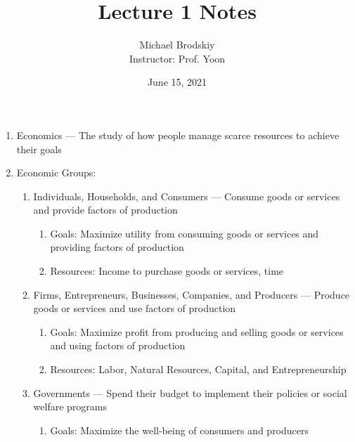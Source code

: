 \documentclass[12pt]{article}
\title{Lecture 1 Notes}
\date{June 15, 2021}
\author{Michael Brodskiy\\ \small Instructor: Prof. Yoon}
\begin{document}
    \maketitle

    \begin{enumerate}

      \item Economics — The study of how people manage scarce resources to achieve their goals

      \item Economic Groups:

        \begin{enumerate}

          \item Individuals, Households, and Consumers — Consume goods or services and provide factors of production

            \begin{enumerate}

              \item Goals: Maximize utility from consuming goods or services and providing factors of production

              \item Resources: Income to purchase goods or services, time

            \end{enumerate}

          \item Firms, Entrepreneurs, Businesses, Companies, and Producers — Produce goods or services and use factors of production
            
            \begin{enumerate}

              \item Goals: Maximize profit from producing and selling goods or services and using factors of production

              \item Resources: Labor, Natural Resources, Capital, and Entrepreneurship

            \end{enumerate}

          \item Governments — Spend their budget to implement their policies or social welfare programs

            \begin{enumerate}

              \item Goals: Maximize the well-being of consumers and producers


\end{enumerate}
\end{enumerate}
\end{enumerate}
\end{document}
